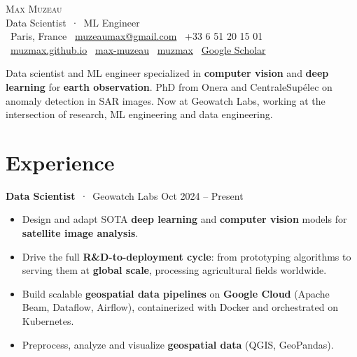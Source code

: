 \documentclass[10pt,a4paper]{article}
\newcommand{\entry}[3]{%
  \noindent\textbf{#1} \,{\color{cvgreen}·}\, {\color{cvgreen}#2}%
  \hfill {\color{cvgray}\small #3}\par}
\newcommand{\sep}{\;{\color{cvgreenlight}|}\;}
\begin{document}
\begin{center}
  {\Huge\scshape\color{cvgreen} Max Muzeau}\\[0.45em]
  {\large Data Scientist \,{\color{cvgreenlight}·}\, ML Engineer}\\[0.5em]
  {\small
    \ Paris, France \sep
    \ \href{mailto:muzeaumax@gmail.com}{muzeaumax@gmail.com} \sep
    \ +33 6 51 20 15 01\\[0.25em]
  {\small
    \ \href{https://muzmax.github.io}{muzmax.github.io} \sep
    \ \href{https://www.linkedin.com/in/max-muzeau}{max-muzeau} \sep
    \ \href{https://github.com/muzmax}{muzmax} \sep
    \ \href{https://scholar.google.com/citations?user=66GPGlEAAAAJ}{Google Scholar}}}
\end{center}

\vspace{-0.3em}
\noindent Data scientist and ML engineer specialized in \textbf{computer vision} and \textbf{deep learning} for \textbf{earth observation}. PhD from Onera and CentraleSupélec on anomaly detection in SAR images. Now at Geowatch Labs, working at the intersection of research, ML engineering and data engineering.

\section{Experience}

\entry{Data Scientist}{Geowatch Labs}{Oct 2024 -- Present}
\begin{itemize}
  \item Design and adapt SOTA \textbf{deep learning} and \textbf{computer vision} models for \textbf{satellite image analysis}.
  \item Drive the full \textbf{R\&D-to-deployment cycle}: from prototyping algorithms to serving them at \textbf{global scale}, processing agricultural fields worldwide.
  \item Build scalable \textbf{geospatial data pipelines} on \textbf{Google Cloud} (Apache Beam, Dataflow, Airflow), containerized with Docker and orchestrated on Kubernetes.
  \item Preprocess, analyze and visualize \textbf{geospatial data} (QGIS, GeoPandas).
\end{itemize}
\end{document}
